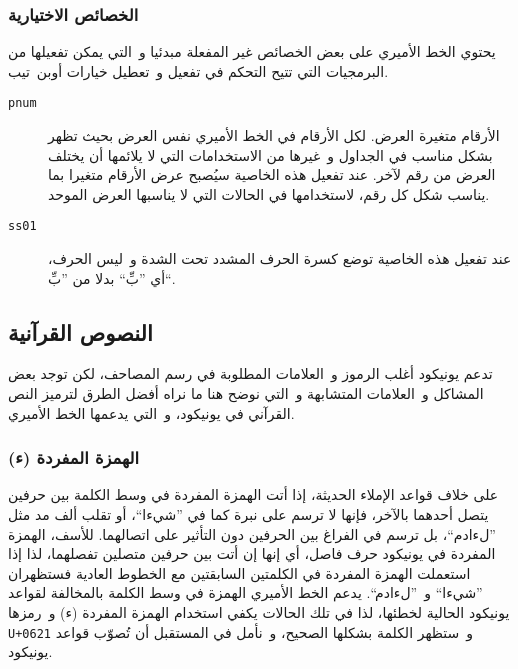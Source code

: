 \documentclass[a4paper]{article}
\newcommand\addff[1]{\addfontfeature{RawFeature={#1}}} %
\renewcommand\U[1]{\colorbox{codecolor}{\texttt{U+#1}}}
\begin{document}
\subsubsection{الخصائص الاختيارية}
يحتوي الخط الأميري على بعض الخصائص غير المفعلة مبدئيا و التي يمكن
تفعيلها من البرمجيات التي تتيح التحكم في تفعيل و تعطيل خيارات أوبن تيب.

\begin{description}
\item[\texttt{pnum}]
	الأرقام متغيرة العرض. لكل الأرقام في الخط الأميري نفس العرض بحيث
	تظهر بشكل مناسب في الجداول و غيرها من الاستخدامات التي لا يلائمها أن
	يختلف العرض من رقم لآخر. عند تفعيل هذه الخاصية سيُصبح عرض الأرقام
	متغيرا بما يناسب شكل كل رقم، لاستخدامها في الحالات التي لا يناسبها
	العرض الموحد.

\item[\texttt{ss01}]
	عند تفعيل هذه الخاصية توضع كسرة الحرف المشدد تحت الشدة و ليس الحرف، أي
	{\addff{+ss01}”بِّ“} بدلا من ”بِّ“.
\end{description}

\subsection{النصوص القرآنية}
\label{ref:quranic-text}
تدعم يونيكود أغلب الرموز و العلامات المطلوبة في رسم المصاحف، لكن توجد
بعض المشاكل و العلامات المتشابهة و التي نوضح هنا ما نراه أفضل الطرق
لترميز النص القرآني في يونيكود، و التي يدعمها الخط الأميري.

\subsubsection{الهمزة المفردة (ء)}
على خلاف قواعد الإملاء الحديثة، إذا أتت الهمزة المفردة في وسط الكلمة بين
حرفين يتصل أحدهما بالآخر، فإنها لا ترسم على نبرة كما في ”شيءا“، أو تقلب
ألف مد مثل ”لءادم“، بل ترسم في الفراغ بين الحرفين دون التأثير على
اتصالهما. للأسف، الهمزة المفردة في يونيكود حرف فاصل، أي إنها إن أتت بين
حرفين متصلين تفصلهما، لذا إذا استعملت الهمزة المفردة في الكلمتين
السابقتين مع الخطوط العادية فستظهران ”شي‌ء‌ا“
و ”ل‌ء‌ادم“. يدعم الخط الأميري الهمزة في وسط الكلمة بالمخالفة
لقواعد يونيكود الحالية لخطئها، لذا في تلك الحالات يكفي استخدام الهمزة
المفردة (ء) و رمزها \U{0621} و ستظهر الكلمة بشكلها الصحيح، و نأمل
في المستقبل أن تُصوّب قواعد يونيكود.
\end{document}

